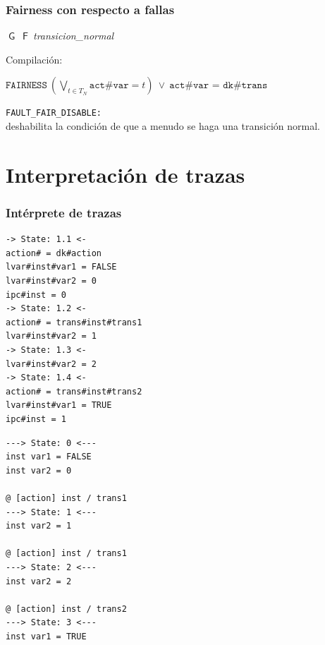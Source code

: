 \documentclass[serif]{beamer}
\newcommand{\G}{\mathop{\mathsf{G}}}
\newcommand{\F}{\mathop{\mathsf{F}}}
\begin{document}
\begin{frame}
\frametitle{Fairness con respecto a fallas}
\begin{framed}
$\G~\F~$\textit{transicion\_normal}
\end{framed}
Compilación:
\begin{framed}
$\texttt{FAIRNESS}~(\bigvee_{t \in {T_N}} \texttt{act\#var} = t)~\vee~\texttt{act\#var = dk\#trans}$
\end{framed}
\texttt{FAULT\_FAIR\_DISABLE:}\\
deshabilita la condición de que a menudo se haga una transición normal.\\[0.3cm]
\end{frame}

\section[Trazas]{Interpretación de trazas}

\begin{frame}[fragile]
\frametitle{Intérprete de trazas}
{\fontsize{9pt}{12pt}\selectfont
\begin{minipage}{0.5\textwidth}
\begin{verbatim}
-> State: 1.1 <-
action# = dk#action
lvar#inst#var1 = FALSE
lvar#inst#var2 = 0
ipc#inst = 0
-> State: 1.2 <-
action# = trans#inst#trans1
lvar#inst#var2 = 1
-> State: 1.3 <-
lvar#inst#var2 = 2
-> State: 1.4 <-
action# = trans#inst#trans2
lvar#inst#var1 = TRUE
ipc#inst = 1
\end{verbatim}
\end{minipage}
\hspace{0.04\textwidth}
\begin{minipage}{0.44\textwidth}
\begin{verbatim}
---> State: 0 <---
inst var1 = FALSE
inst var2 = 0

@ [action] inst / trans1
---> State: 1 <---
inst var2 = 1

@ [action] inst / trans1
---> State: 2 <---
inst var2 = 2

@ [action] inst / trans2
---> State: 3 <---
inst var1 = TRUE
\end{verbatim}
\end{minipage}
} %
\end{frame}
\end{document}
